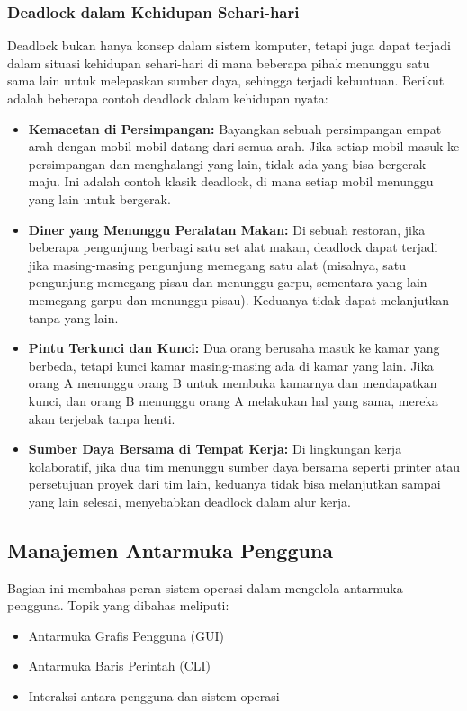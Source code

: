 \documentclass{article}
\begin{document}
\subsubsection{Deadlock dalam Kehidupan Sehari-hari}
Deadlock bukan hanya konsep dalam sistem komputer, tetapi juga dapat terjadi dalam situasi kehidupan sehari-hari di mana beberapa pihak menunggu satu sama lain untuk melepaskan sumber daya, sehingga terjadi kebuntuan. Berikut adalah beberapa contoh deadlock dalam kehidupan nyata:

\begin{itemize}
    \item \textbf{Kemacetan di Persimpangan:} Bayangkan sebuah persimpangan empat arah dengan mobil-mobil datang dari semua arah. Jika setiap mobil masuk ke persimpangan dan menghalangi yang lain, tidak ada yang bisa bergerak maju. Ini adalah contoh klasik deadlock, di mana setiap mobil menunggu yang lain untuk bergerak.
    
    \item \textbf{Diner yang Menunggu Peralatan Makan:} Di sebuah restoran, jika beberapa pengunjung berbagi satu set alat makan, deadlock dapat terjadi jika masing-masing pengunjung memegang satu alat (misalnya, satu pengunjung memegang pisau dan menunggu garpu, sementara yang lain memegang garpu dan menunggu pisau). Keduanya tidak dapat melanjutkan tanpa yang lain.
    
    \item \textbf{Pintu Terkunci dan Kunci:} Dua orang berusaha masuk ke kamar yang berbeda, tetapi kunci kamar masing-masing ada di kamar yang lain. Jika orang A menunggu orang B untuk membuka kamarnya dan mendapatkan kunci, dan orang B menunggu orang A melakukan hal yang sama, mereka akan terjebak tanpa henti.
    
    \item \textbf{Sumber Daya Bersama di Tempat Kerja:} Di lingkungan kerja kolaboratif, jika dua tim menunggu sumber daya bersama seperti printer atau persetujuan proyek dari tim lain, keduanya tidak bisa melanjutkan sampai yang lain selesai, menyebabkan deadlock dalam alur kerja.
\end{itemize}

\subsection{Manajemen Antarmuka Pengguna}
Bagian ini membahas peran sistem operasi dalam mengelola antarmuka pengguna. Topik yang dibahas meliputi:
\begin{itemize}
    \item Antarmuka Grafis Pengguna (GUI)
    \item Antarmuka Baris Perintah (CLI)
    \item Interaksi antara pengguna dan sistem operasi
\end{itemize}
\end{document}
